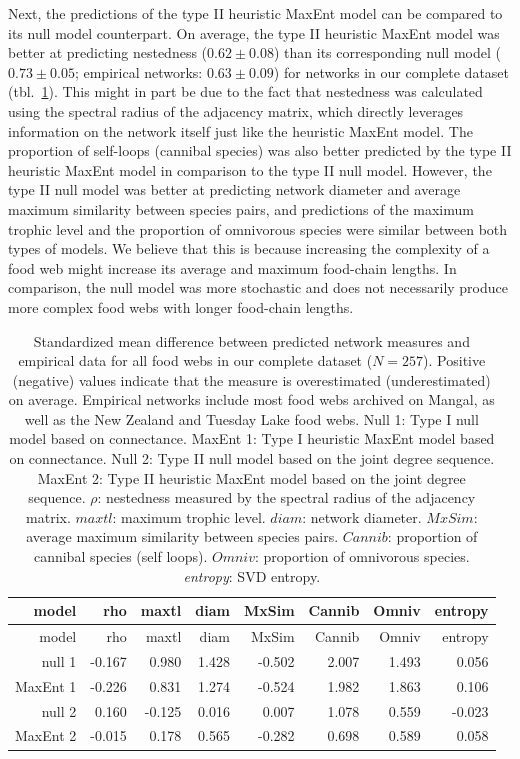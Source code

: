 \documentclass[11pt]{article}
\begin{document}
Next, the predictions of the type II heuristic MaxEnt model can be
compared to its null model counterpart. On average, the type II
heuristic MaxEnt model was better at predicting nestedness
(\(0.62 \pm 0.08\)) than its corresponding null model
(\(0.73 \pm 0.05\); empirical networks: \(0.63 \pm 0.09\)) for networks
in our complete dataset (tbl.~\ref{tbl:measures_all}). This might in
part be due to the fact that nestedness was calculated using the
spectral radius of the adjacency matrix, which directly leverages
information on the network itself just like the heuristic MaxEnt model.
The proportion of self-loops (cannibal species) was also better
predicted by the type II heuristic MaxEnt model in comparison to the
type II null model. However, the type II null model was better at
predicting network diameter and average maximum similarity between
species pairs, and predictions of the maximum trophic level and the
proportion of omnivorous species were similar between both types of
models. We believe that this is because increasing the complexity of a
food web might increase its average and maximum food-chain lengths. In
comparison, the null model was more stochastic and does not necessarily
produce more complex food webs with longer food-chain lengths.

\hypertarget{tbl:measures_all}{}
\begin{longtable}[]{@{}rrrrrrrr@{}}
\caption{\label{tbl:measures_all}Standardized mean difference between
predicted network measures and empirical data for all food webs in our
complete dataset (\(N = 257\)). Positive (negative) values indicate that
the measure is overestimated (underestimated) on average. Empirical
networks include most food webs archived on Mangal, as well as the New
Zealand and Tuesday Lake food webs. Null 1: Type I null model based on
connectance. MaxEnt 1: Type I heuristic MaxEnt model based on
connectance. Null 2: Type II null model based on the joint degree
sequence. MaxEnt 2: Type II heuristic MaxEnt model based on the joint
degree sequence. \(\rho\): nestedness measured by the spectral radius of
the adjacency matrix. \(maxtl\): maximum trophic level. \(diam\):
network diameter. \(MxSim\): average maximum similarity between species
pairs. \(Cannib\): proportion of cannibal species (self loops).
\(Omniv\): proportion of omnivorous species. \emph{entropy}: SVD
entropy.}\tabularnewline
\toprule
model & rho & maxtl & diam & MxSim & Cannib & Omniv &
entropy\tabularnewline
\midrule
\endfirsthead
\toprule
model & rho & maxtl & diam & MxSim & Cannib & Omniv &
entropy\tabularnewline
\midrule
\endhead
null 1 & -0.167 & 0.980 & 1.428 & -0.502 & 2.007 & 1.493 &
0.056\tabularnewline
MaxEnt 1 & -0.226 & 0.831 & 1.274 & -0.524 & 1.982 & 1.863 &
0.106\tabularnewline
null 2 & 0.160 & -0.125 & 0.016 & 0.007 & 1.078 & 0.559 &
-0.023\tabularnewline
MaxEnt 2 & -0.015 & 0.178 & 0.565 & -0.282 & 0.698 & 0.589 &
0.058\tabularnewline
\bottomrule
\end{longtable}
\end{document}
